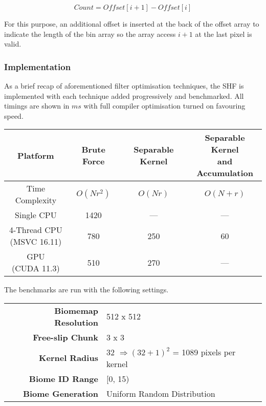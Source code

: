 \documentclass[oneside, a4paper]{report}
\begin{document}
    \begin{equation}
        Count = Offset[i + 1] - Offset[i]
    \end{equation}

    For this purpose, an additional offset is inserted at the back of the offset array to indicate the length of the bin array so the array access \(i + 1\) at the last pixel is valid.

    \subsubsection{Implementation}

    As a brief recap of aforementioned filter optimisation techniques, the SHF is implemented with each technique added progressively and benchmarked. All timings are shown in $ms$ with full compiler optimisation turned on favouring speed.

    \begin{center}
        \begin{tabular}{|c||c|c|c|}
            \hline
            Platform & Brute Force & Separable Kernel & \shortstack{Separable Kernel \\ and \\ Accumulation} \\
            \hline \hline
            Time Complexity & \(O(Nr^{2})\) & \(O(Nr)\) & \(O(N + r)\) \\
            \hline
            Single CPU & 1420 & --- & --- \\
            \hline
            \shortstack{4-Thread CPU \\ (MSVC 16.11)} & 780 & 250 & 60 \\
            \hline
            \shortstack{GPU \\ (CUDA 11.3)} & 510 & 270 & --- \\
            \hline
        \end{tabular}
    \end{center}

    The benchmarks are run with the following settings.

    \begin{tabular}{rl}
        \textbf{Biomemap Resolution} & 512 x 512 \\
        \textbf{Free-slip Chunk} & 3 x 3 \\
        \textbf{Kernel Radius} & 32 \(\Rightarrow (32 + 1)^{2}\) = 1089 pixels per kernel \\
        \textbf{Biome ID Range} & [0, 15) \\
        \textbf{Biome Generation} & Uniform Random Distribution
    \end{tabular}
\end{document}
